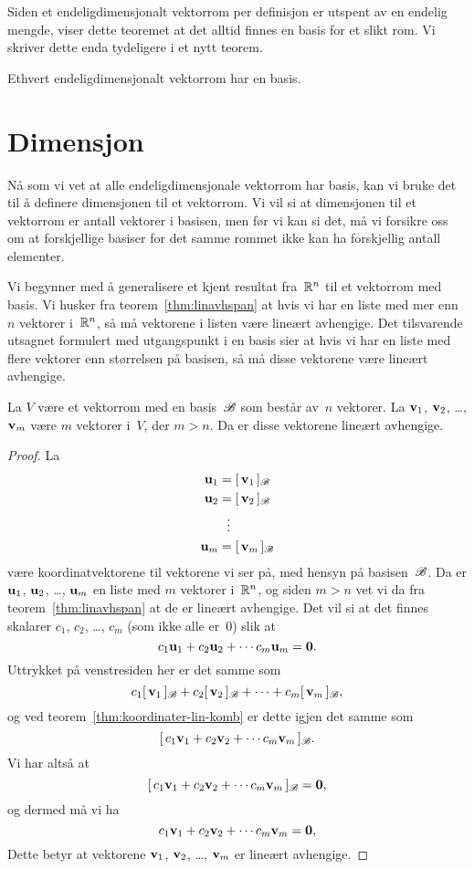 Siden et endeligdimensjonalt vektorrom per definisjon er utspent av en
endelig mengde, viser dette teoremet at det alltid finnes en basis for
et slikt rom.  Vi skriver dette enda tydeligere i et nytt teorem.

\begin{thm}
Ethvert endeligdimensjonalt vektorrom har en basis.
\end{thm}




\section*{Dimensjon}

Nå som vi vet at alle endeligdimensjonale vektorrom har basis, kan vi
bruke det til å definere dimensjonen til et vektorrom.  Vi vil si at
dimensjonen til et vektorrom er antall vektorer i basisen, men før vi
kan si det, må vi forsikre oss om at forskjellige basiser for det
samme rommet ikke kan ha forskjellig antall elementer.

Vi begynner med å generalisere et kjent resultat fra~$\mathbb{R}^n$ til et
vektorrom med basis.  Vi husker fra teorem~\ref{thm:linavhspan} at
hvis vi har en liste med mer enn~$n$ vektorer i~$\mathbb{R}^n$, så må
vektorene i listen være lineært avhengige.  Det tilsvarende utsagnet
formulert med utgangspunkt i en basis sier at hvis vi har en liste med
flere vektorer enn størrelsen på basisen, så må disse vektorene være
lineært avhengige.

\begin{thm}
\label{thm:flere-vektorer-enn-str-basis}
La $V$ være et vektorrom med en basis~$\mathscr{B}$ som består av~$n$ vektorer.
La $\mathbf{v}_1$, $\mathbf{v}_2$, \ldots, $\mathbf{v}_m$ være $m$ vektorer i~$V$, der $m > n$.
Da er disse vektorene lineært avhengige.
\end{thm}
\begin{proof}
La
\begin{align*}
\mathbf{u}_1 &= [\,{\mathbf{v}_1}\,]_{\mathscr{B}} \\
\mathbf{u}_2 &= [\,{\mathbf{v}_2}\,]_{\mathscr{B}} \\
     &\ \ \vdots \\
\mathbf{u}_m &= [\,{\mathbf{v}_m}\,]_{\mathscr{B}}
\end{align*}
være koordinatvektorene til vektorene vi ser på, med hensyn på
basisen~$\mathscr{B}$.  Da er $\mathbf{u}_1$, $\mathbf{u}_2$, \ldots, $\mathbf{u}_m$ en liste med $m$
vektorer i~$\mathbb{R}^n$, og siden $m > n$ vet vi da fra
teorem~\ref{thm:linavhspan} at de er lineært avhengige.  Det vil si at
det finnes skalarer $c_1$, $c_2$, \ldots, $c_m$ (som ikke alle er~$0$)
slik at
\[
c_1 \mathbf{u}_1 + c_2 \mathbf{u}_2 + \cdots c_m \mathbf{u}_m = \mathbf{0}.
\]
Uttrykket på venstresiden her er det samme som
\[
c_1 [\,{\mathbf{v}_1}\,]_{\mathscr{B}} + c_2 [\,{\mathbf{v}_2}\,]_{\mathscr{B}} + \cdots + c_m [\,{\mathbf{v}_m}\,]_{\mathscr{B}},
\]
og ved teorem~\ref{thm:koordinater-lin-komb} er dette igjen det samme
som
\[
[\,{c_1 \mathbf{v}_1 + c_2 \mathbf{v}_2 + \cdots c_m \mathbf{v}_m}\,]_{\mathscr{B}}.
\]
Vi har altså at
\[
[\,{c_1 \mathbf{v}_1 + c_2 \mathbf{v}_2 + \cdots c_m \mathbf{v}_m}\,]_{\mathscr{B}} = \mathbf{0},
\]
og dermed må vi ha
\[
c_1 \mathbf{v}_1 + c_2 \mathbf{v}_2 + \cdots c_m \mathbf{v}_m = \mathbf{0},
\]
Dette betyr at vektorene $\mathbf{v}_1$, $\mathbf{v}_2$, \ldots, $\mathbf{v}_m$ er lineært
avhengige.
\end{proof}

